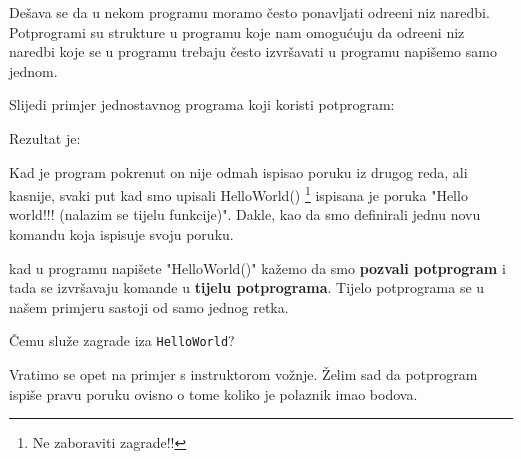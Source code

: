 De\v{s}ava se da u nekom programu moramo \v{c}esto ponavljati odre\dj{}eni
niz naredbi. Potprogrami
su strukture u programu koje nam omogu\'{c}uju da odre\dj{}eni niz naredbi
koje se u programu trebaju \v{c}esto izvr\v{s}avati u programu napi\v{s}emo
samo jednom.

Slijedi primjer jednostavnog programa koji koristi potprogram:


Rezultat je:


Kad je program pokrenut on nije odmah ispisao poruku iz drugog
reda, ali kasnije, svaki put kad smo upisali HelloWorld() \footnote{Ne
zaboraviti zagrade!!} ispisana je poruka "Hello world!!! (nalazim
se  tijelu funkcije)". Dakle, kao da smo definirali jednu novu
komandu koja ispisuje svoju poruku. 

kad u programu napi\v{s}ete "HelloWorld()" ka\v{z}emo da smo
\textbf{pozvali potprogram} i tada se izvr\v{s}avaju komande u \textbf{tijelu
potprograma}. Tijelo potprograma se u na\v{s}em primjeru sastoji od samo
jednog retka.

\v{C}emu slu\v{z}e zagrade iza \verb"HelloWorld"? 

Vratimo se opet na primjer s instruktorom vo\v{z}nje. \v{Z}elim sad da
potprogram ispi\v{s}e pravu poruku ovisno o tome koliko je polaznik imao
bodova. 


